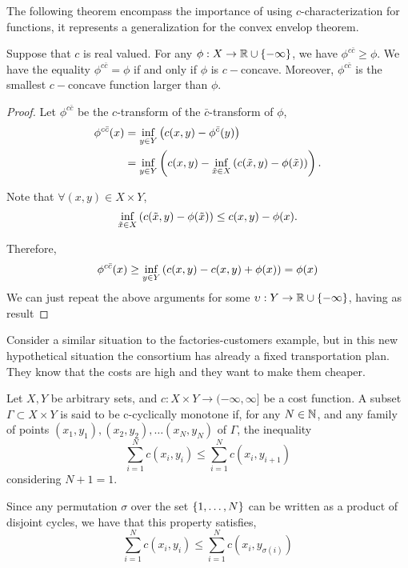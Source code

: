 The following theorem encompass the importance of using $c$-characterization for functions, it represents a generalization for the convex envelop theorem.
\begin{theorem}
Suppose that $c$ is real valued. For any $\phi: X\rightarrow \mathbb{R}\cup \left\lbrace -\infty \right\rbrace$, we have $\phi^{c\bar c}\geq \phi$. We have the equality $\phi^{c\bar c}=\phi$ if and only if $\phi$ is $c-$concave. Moreover, $\phi^{c\bar c}$ is the smallest $c-$concave function larger than $\phi$.
\end{theorem}
\begin{proof}
	Let $\phi^{c\bar {c}}$ be the $c$-transform of the $\bar{c}$-transform of $\phi$,
	\begin{align*}
		\phi^{c\bar c}(x)&=\inf_{y\in Y} \left( c(x,y)-\phi^{\bar{c}}(y) \right)\\
		&=\inf_{y\in Y} \left( c(x,y)-\inf_{\tilde x\in X}\left( c(\tilde x,y)-\phi(\tilde x) \right) \right).
	\end{align*}
	
	Note that $\forall (x, y) \in X\times Y$,
	\begin{equation*}
		\inf_{\tilde x \in X}\left(  c(\tilde x,y)-\phi(\tilde x)  \right)\leq c(x, y) - \phi (x).
	\end{equation*}
	
	Therefore, 
	\begin{equation*}
		\phi^{c\bar c}(x)\geq \inf_{y\in Y}\left( c(x,y)-c(x,y)+\phi(x) \right)=\phi(x)
	\end{equation*}
	We can just repeat the above arguments for some $\upsilon:Y\rightarrow \mathbb{R}\cup\left\lbrace -\infty \right\rbrace$, having as result 
\end{proof}

Consider a similar situation to the factories-customers example, but in this new hypothetical situation the consortium has already a fixed transportation plan. They know that the costs are high and they want to make them cheaper.
\begin{definition}
	Let $X , Y$ be arbitrary sets, and $c:X\times Y \rightarrow (-\infty, \infty]$ be a cost function. A subset $\Gamma \subset X \times Y$ is said to be c-cyclically monotone if, for any $N\in\mathbb{N}$, and any family of points $(x_1, y_1), (x_2, y_2), \dots (x_N, y_N)$ of $\Gamma$, the inequality
	\begin{equation*}
	\sum_{i=1}^{N} c(x_i, y_i) \leq \sum_{i=1}^{N} c(x_i, y_{i+1}) 
	\end{equation*} 
	considering $N+1=1$. 
\end{definition}
Since any permutation $\sigma$ over the set $\left\lbrace 1, \dots, N \right\rbrace$ can be written as a product of disjoint cycles, we have that this property satisfies,
\begin{equation}
\sum_{i=1}^{N} c(x_i, y_i) \leq \sum_{i=1}^{N} c(x_i, y_{\sigma(i)}) 
\end{equation}

